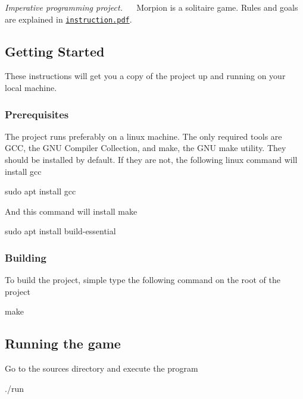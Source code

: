{\itshape Imperative programming project.}~\newline
~\newline
 Morpion is a solitaire game. Rules and goals are explained in \href{doc/instructions.pdf}{\tt \textquotesingle{}instruction.\+pdf\textquotesingle{}}.

\subsection*{Getting Started}

These instructions will get you a copy of the project up and running on your local machine.

\subsubsection*{Prerequisites}

The project runs preferably on a linux machine. The only required tools are G\+CC, the G\+NU Compiler Collection, and make, the G\+NU make utility. They should be installed by default. If they are not, the following linux command will install gcc


\begin{DoxyCode}
sudo apt install gcc
\end{DoxyCode}


And this command will install make


\begin{DoxyCode}
sudo apt install build-essential
\end{DoxyCode}


\subsubsection*{Building}

To build the project, simple type the following command on the root of the project


\begin{DoxyCode}
make
\end{DoxyCode}


\subsection*{Running the game}

Go to the sources directory and execute the program


\begin{DoxyCode}
./run
\end{DoxyCode}


